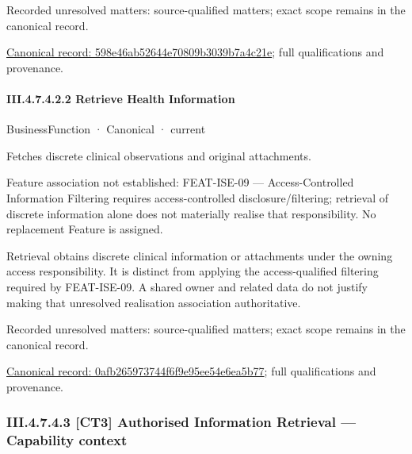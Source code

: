 {\small Recorded unresolved matters: source-qualified matters; exact scope remains in the canonical record.}\par
{\footnotesize \href{../../../../../../../continuum/business/business-function/598e46ab52644e70809b3039b7a4c21e.md}{Canonical record: 598e46ab52644e70809b3039b7a4c21e}; full qualifications and provenance.}\par
\paragraph*{III.4.7.4.2.2 Retrieve Health Information}
\label{navigation:III.4.7.4.2.2}

\label{element:0afb265973744f6f9e95ee54e6ea5b77}
{\small BusinessFunction · Canonical · current}\par

Fetches discrete clinical observations and original attachments.



Feature association not established: FEAT-ISE-09 — Access-Controlled Information Filtering requires access-controlled disclosure/filtering; retrieval of discrete information alone does not materially realise that responsibility. No replacement Feature is assigned.



Retrieval obtains discrete clinical information or attachments under the owning access responsibility. It is distinct from applying the access-qualified filtering required by FEAT-ISE-09. A shared owner and related data do not justify making that unresolved realisation association authoritative.


{\small Recorded unresolved matters: source-qualified matters; exact scope remains in the canonical record.}\par
{\footnotesize \href{../../../../../../../continuum/business/business-function/0afb265973744f6f9e95ee54e6ea5b77.md}{Canonical record: 0afb265973744f6f9e95ee54e6ea5b77}; full qualifications and provenance.}\par
\subsubsection*{III.4.7.4.3 [CT3] Authorised Information Retrieval — Capability context}
\label{navigation:III.4.7.4.3}

